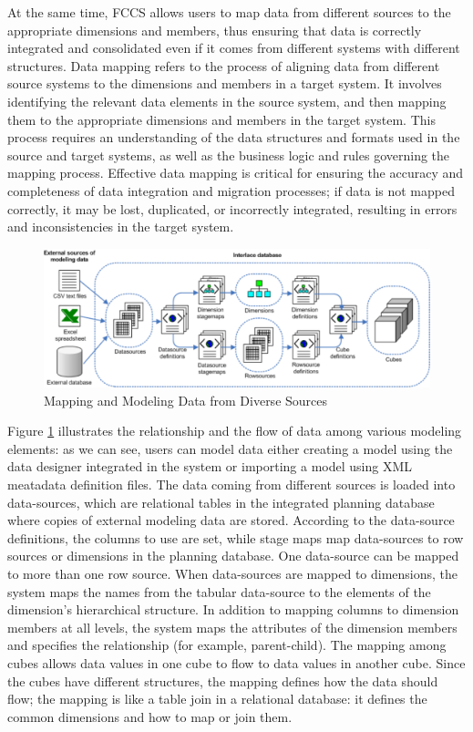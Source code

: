 \documentclass[12pt,a4paper,openright,twoside]{book}
\begin{document}
At the same time, FCCS allows users to map data from different sources to the appropriate dimensions and members, thus ensuring that data is correctly integrated and consolidated even if it comes from different systems with different structures.
%
Data mapping refers to the process of aligning data from different source systems to the dimensions and members in a target system.
%
It involves identifying the relevant data elements in the source system, and then mapping them to the appropriate dimensions and members in the target system. 
%
This process requires an understanding of the data structures and formats used in the source and target systems, as well as the business logic and rules governing the mapping process.
%
Effective data mapping is critical for ensuring the accuracy and completeness of data integration and migration processes; if data is not mapped correctly, it may be lost, duplicated, or incorrectly integrated, resulting in errors and inconsistencies in the target system. 

\begin{figure}[htbp]
	\centering
	\includegraphics[width=\linewidth]{figures/data-mapping.pdf}
	\caption{Mapping and Modeling Data from Diverse Sources}
	\label{fig:mapping}
\end{figure}

Figure \ref{fig:mapping} illustrates the relationship and the flow of data among various modeling elements:
%
as we can see, users can model data either creating a model using the data designer integrated in the system or importing a model using XML meatadata definition files.
%
The data coming from different sources is loaded into data-sources, which are relational tables in the integrated planning database where copies of external modeling data are stored. 
%
According to the data-source definitions, the columns to use are set, while stage maps map data-sources to row sources or dimensions in the planning database. 
%
One data-source can be mapped to more than one row source.
%
When data-sources are mapped to dimensions, the system maps the names from the tabular data-source to the elements of the dimension’s hierarchical structure. 
%
In addition to mapping columns to dimension members at all levels, the system maps the attributes of the dimension members and specifies the relationship (for example, parent-child).
%
The mapping among cubes allows data values in one cube to flow to data values in another cube. 
%
Since the cubes have different structures, the mapping defines how the data should flow; the mapping is like a table join in a relational database: it defines the common dimensions and how to map or join them.
\end{document}

